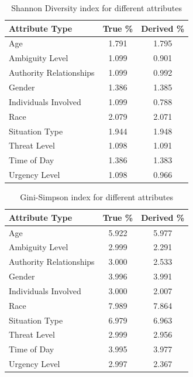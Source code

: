 \documentclass[11pt]{article}
\begin{document}
\begin{table}[H]
\centering
\caption{Shannon Diversity index for different attributes}
\begin{tabularx}{\columnwidth}{|X|c|c|}
\hline
\textbf{Attribute Type} & \textbf{True \%} & \textbf{Derived \%} \\
\hline
Age & 1.791 & 1.795 \\
\hline
Ambiguity Level & 1.099 & 0.901 \\
\hline
Authority Relationships & 1.099 & 0.992 \\
\hline
Gender & 1.386 & 1.385 \\
\hline
Individuals Involved & 1.099 & 0.788 \\
\hline
Race & 2.079 & 2.071 \\
\hline
Situation Type & 1.944 & 1.948 \\
\hline
Threat Level & 1.098 & 1.091 \\
\hline
Time of Day & 1.386 & 1.383 \\
\hline
Urgency Level & 1.098 & 0.966 \\
\hline
\end{tabularx}
\end{table}

\begin{table}[H]
\centering
\caption{Gini-Simpson index for different attributes}
\begin{tabularx}{\columnwidth}{|X|c|c|}
\hline
\textbf{Attribute Type} & \textbf{True \%} & \textbf{Derived \%} \\
\hline
Age & 5.922 & 5.977 \\
\hline
Ambiguity Level & 2.999 & 2.291 \\
\hline
Authority Relationships & 3.000 & 2.533 \\
\hline
Gender & 3.996 & 3.991 \\
\hline
Individuals Involved & 3.000 & 2.007 \\
\hline
Race & 7.989 & 7.864 \\
\hline
Situation Type & 6.979 & 6.963 \\
\hline
Threat Level & 2.999 & 2.956 \\
\hline
Time of Day & 3.995 & 3.977 \\
\hline
Urgency Level & 2.997 & 2.367 \\
\hline
\end{tabularx}
\end{table}
\end{document}
